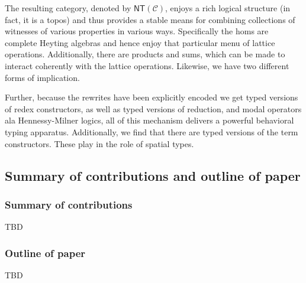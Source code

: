 The resulting category, denoted by $\mathsf{NT}(\mathcal{C})$, enjoys
a rich logical structure (in fact, it is a topos) and thus provides a
stable means for combining collections of witnesses of various
properties in various ways. Specifically the homs are complete Heyting
algebras and hence enjoy that particular menu of lattice
operations. Additionally, there are products and sums, which can be
made to interact coherently with the lattice operations. Likewise, we
have two different forms of implication.

Further, because the rewrites have been explicitly encoded we get
typed versions of redex constructors, as well as typed versions of
reduction, and modal operators ala Hennessy-Milner logics, all of this
mechanism delivers a powerful behavioral typing
apparatus. Additionally, we find that there are typed versions of the
term constructors. These play in the role of spatial types. 

\subsection{Summary of contributions and outline of paper}

\subsubsection{Summary of contributions}
TBD

\subsubsection{Outline of paper}
TBD

